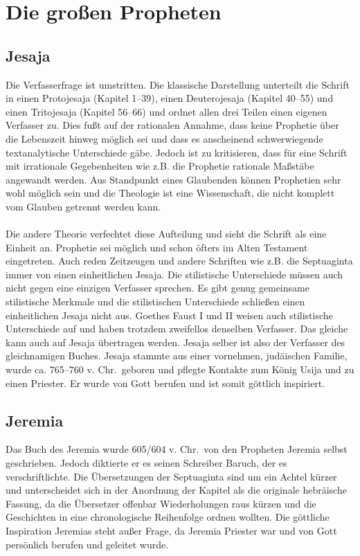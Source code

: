 \section{Die großen Propheten}
\subsection*{Jesaja}
Die Verfasserfrage ist umstritten. Die klassische Darstellung unterteilt die Schrift in einen Protojesaja (Kapitel 1--39), einen Deuterojesaja  (Kapitel 40--55) und einen Tritojesaja (Kapitel 56--66) und ordnet allen drei Teilen einen eigenen Verfasser zu. Dies fußt auf der rationalen Annahme, dass keine Prophetie über die Lebenszeit hinweg möglich sei und dass es anscheinend schwerwiegende textanalytische Unterschiede gäbe. Jedoch ist zu kritisieren, dass für eine Schrift mit irrationale Gegebenheiten wie z.B. die Prophetie rationale Maßstäbe angewandt werden. Aus Standpunkt eines Glaubenden können Prophetien sehr wohl möglich sein und die Theologie ist eine Wissenschaft, die nicht komplett vom Glauben getrennt werden kann.
\\~\\
Die andere Theorie verfechtet diese Aufteilung und sieht die Schrift als eine Einheit an. Prophetie sei möglich und schon öfters im Alten Testament eingetreten. Auch reden Zeitzeugen und andere Schriften wie z.B. die Septuaginta immer von einen einheitlichen Jesaja. Die stilistische Unterschiede müssen auch nicht gegen eine einzigen Verfasser sprechen. Es gibt genug gemeinsame stilistische Merkmale und die stilistischen Unterschiede schließen einen einheitlichen Jesaja nicht aus. Goethes Faust I und II weisen auch stilistische Unterschiede auf und haben trotzdem zweifellos denselben Verfasser. Das gleiche kann auch auf Jesaja übertragen werden. Jesaja selber ist also der Verfasser des gleichnamigen Buches. Jesaja stammte aus einer vornehmen, judäischen Familie, wurde ca. 765--760 v. Chr.\ geboren und pflegte Kontakte zum König Usija und zu einen Priester. Er wurde von Gott berufen und ist somit göttlich inspiriert.

\subsection*{Jeremia}
Das Buch des Jeremia wurde 605/604 v. Chr.\ von den Propheten Jeremia selbst geschrieben. Jedoch diktierte er es seinen Schreiber Baruch, der es verschriftlichte. Die Übersetzungen der Septuaginta sind um ein Achtel kürzer und unterscheidet sich in der Anordnung der Kapitel als die originale hebräische Fassung, da die Übersetzer offenbar Wiederholungen raus kürzen und die Geschichten in eine chronologische Reihenfolge ordnen wollten. Die göttliche Inspiration Jeremias steht außer Frage, da Jeremia Priester war und von Gott persönlich berufen und geleitet wurde.


